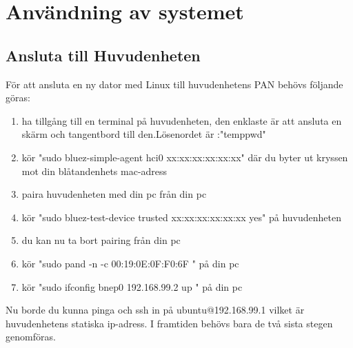 \section{Användning av systemet}

\subsection{Ansluta till Huvudenheten}
För att ansluta en ny dator med Linux till huvudenhetens PAN behövs följande göras:
\begin{enumerate}
	\item ha tillgång till en terminal på huvudenheten, den enklaste är att ansluta en skärm och tangentbord till den.\newline Lösenordet är :"temppwd"
	\item kör "sudo bluez-simple-agent hci0 xx:xx:xx:xx:xx:xx" där du byter ut kryssen mot din blåtandenhets mac-adress
	\item paira huvudenheten med din pc från din pc
	\item  kör "sudo bluez-test-device trusted xx:xx:xx:xx:xx:xx yes" på huvudenheten
	\item du kan nu ta bort pairing från din pc
	\item kör "sudo pand -n -c 00:19:0E:0F:F0:6F	" på din pc
	\item kör "sudo ifconfig bnep0 192.168.99.2 up " på din pc
\end{enumerate}
Nu borde du kunna pinga och ssh in på ubuntu@192.168.99.1 vilket är huvudenhetens statiska ip-adress. I framtiden behövs bara de två sista stegen genomföras.

